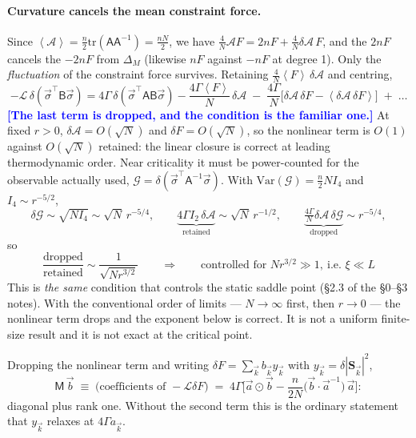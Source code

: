 \documentclass[11pt,a4paper]{article}
\newcommand{\bk}{\vec k}
\newcommand{\avg}[1]{\left\langle #1 \right\rangle}
\newcommand{\FLAG}[1]{\textcolor{blue}{\textbf{[#1]}}}
\newcommand{\Ac}{\mathcal{A}}
\newcommand{\Gc}{\mathcal{G}}
\newcommand{\Lc}{\mathcal{L}}
\newcommand{\Mc}{\mathsf{M}}
\newcommand{\bk}{\vec k}
\newcommand{\bs}{\vec\sigma}
\newcommand{\avg}[1]{\left\langle #1 \right\rangle}
\newcommand{\FLAG}[1]{\textcolor{blue}{\textbf{[#1]}}}
\begin{document}
\paragraph{Curvature cancels the mean constraint force.} Since
$\avg{\Ac}=\tfrac n2\mathrm{tr}(\mathsf A\mathsf A^{-1})=\tfrac{nN}{2}$, we have
$\tfrac4N\Ac F=2nF+\tfrac4N\delta\Ac\,F$, and the $2nF$ cancels the $-2nF$ from $\Delta_M$
(likewise $nF$ against $-nF$ at degree 1). Only the \emph{fluctuation} of the constraint
force survives. Retaining $\tfrac4N\avg F\,\delta\Ac$ and centring,
\begin{equation}
  -\Lc\,\delta\!\left(\bs^\top\mathsf B\bs\right)
   =4\Gamma\,\delta\!\left(\bs^\top\mathsf A\mathsf B\bs\right)
    -\frac{4\Gamma\avg{F}}{N}\,\delta\Ac
    \;-\;\frac{4\Gamma}{N}\Big[\delta\Ac\,\delta F-\avg{\delta\Ac\,\delta F}\Big]
    \;+\;\ldots
  \label{eq:Mop}
\end{equation}
\FLAG{The last term is dropped, and the condition is the familiar one.} At fixed $r>0$,
$\delta\Ac=O(\sqrt N)$ and $\delta F=O(\sqrt N)$, so the nonlinear term is $O(1)$ against
$O(\sqrt N)$ retained: the linear closure is correct at leading thermodynamic order. Near
criticality it must be power-counted for the observable actually used,
$\Gc=\delta(\bs^\top\mathsf A^{-1}\bs)$. With $\mathrm{Var}(\Gc)=\tfrac n2NI_4$ and
$I_4\sim r^{-5/2}$,
\begin{equation}
  \delta\Gc\sim\sqrt{NI_4}\sim\sqrt N\,r^{-5/4},
  \qquad
  \underbrace{4\Gamma I_2\,\delta\Ac}_{\text{retained}}\sim\sqrt N\,r^{-1/2},
  \qquad
  \underbrace{\tfrac{4\Gamma}{N}\delta\Ac\,\delta\Gc}_{\text{dropped}}\sim r^{-5/4},
\end{equation}
so
\begin{equation}
  \boxed{\ \frac{\text{dropped}}{\text{retained}}\sim\frac{1}{\sqrt{N r^{3/2}}}
  \qquad\Longrightarrow\qquad \text{controlled for } Nr^{3/2}\gg1,\ \text{i.e. }\xi\ll L\ }
  \label{eq:control}
\end{equation}
This is \emph{the same} condition that controls the static saddle point (\S2.3 of the
\S0--\S3 notes). With the conventional order of limits --- $N\to\infty$ first, then
$r\to0$ --- the nonlinear term drops and the exponent below is correct. It is not a uniform
finite-size result and it is not exact at the critical point.

Dropping the nonlinear term and writing $\delta F=\sum_{\bk}b_{\bk}y_{\bk}$ with
$y_{\bk}=\delta|\bm S_{\bk}|^2$,
\begin{equation}
  \Mc\,\vec b\;\equiv\;\text{(coefficients of }-\Lc\delta F)\;=\;
  4\Gamma\Big[\vec a\odot\vec b-\frac{n}{2N}\big(\vec b\cdot\vec a^{-1}\big)\,\vec a\Big] :
  \label{eq:Mmatrix}
\end{equation}
diagonal plus rank one. Without the second term this is the ordinary statement that
$y_{\bk}$ relaxes at $4\Gamma a_{\bk}$.
\end{document}
